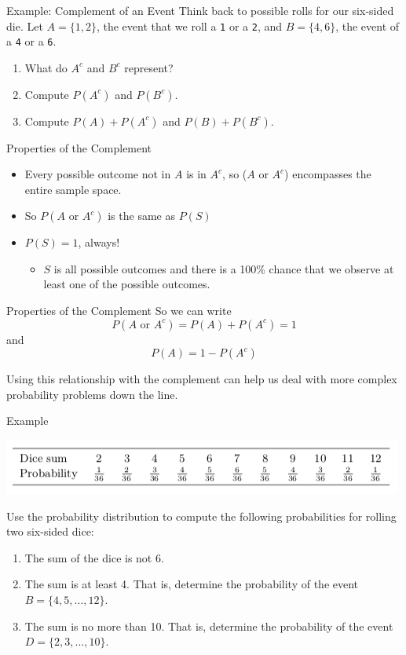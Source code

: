 \begin{frame}{Example: Complement of an Event}
    Think back to possible rolls for our six-sided die. Let $A=\{1,2\}$, the event that we roll a \texttt{1} or a \texttt{2}, and $B=\{4,6\}$, the event of a \texttt{4} or a \texttt{6}.
    \begin{enumerate}
        \item What do $A^c$ and $B^c$ represent?
        \item Compute $P(A^c)$ and $P(B^c)$.
        \item Compute $P(A)+P(A^c)$ and $P(B)+P(B^c)$.
    \end{enumerate}
\end{frame}

\begin{frame}{Properties of the Complement}
    \begin{itemize}
        \item Every possible outcome not in $A$ is in $A^c$, so ($A$ or $A^c$) encompasses the entire sample space.
        \item So $P(A \text{ or } A^c)$ is the same as $P(S)$
        \item $P(S)=1$, always! 
        \begin{itemize}
            \item $S$ is all possible outcomes and there is a 100\% chance that we observe at least one of the possible outcomes.
        \end{itemize}
    \end{itemize}
\end{frame}

\begin{frame}{Properties of the Complement}
    So we can write
    \[
    P(A \text{ or } A^c) = P(A)+P(A^c)=1
    \]
    and 
    \[
    P(A) = 1-P(A^c)
    \]
    
    \vspace{12pt}Using this relationship with the complement can help us deal with more complex probability problems down the line.
\end{frame}

\begin{frame}{Example}
    \begin{center}
        \includegraphics[scale=0.5]{images/sum2d6.png}
    \end{center}
    Use the probability distribution to compute the following probabilities for rolling two six-sided dice:
    \begin{enumerate}
        \item The sum of the dice is not 6.
        \item The sum is at least 4. That is, determine the probability of the event $B = \{4, 5, ..., 12\}$.
        \item The sum is no more than 10. That is, determine the probability of the event $D = \{2, 3, ..., 10\}$.
    \end{enumerate}
\end{frame}

